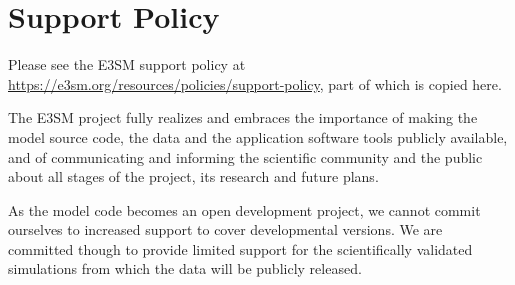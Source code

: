 \chapter{Support Policy}
\label{chap:ocean-support}
Please see the E3SM support policy at
\href{https://e3sm.org/resources/policies/support-policy}{https://e3sm.org/resources/policies/support-policy}, part of which is copied here.

The E3SM project fully realizes and embraces the importance of making the model source code, the data and the application software tools publicly available, and of communicating and informing the scientific community and the public about all stages of the project, its research and future plans.

As the model code becomes an open development project, we cannot commit ourselves to increased support to cover developmental versions. We are committed though to provide limited support for the scientifically validated simulations from which the data will be publicly released.
